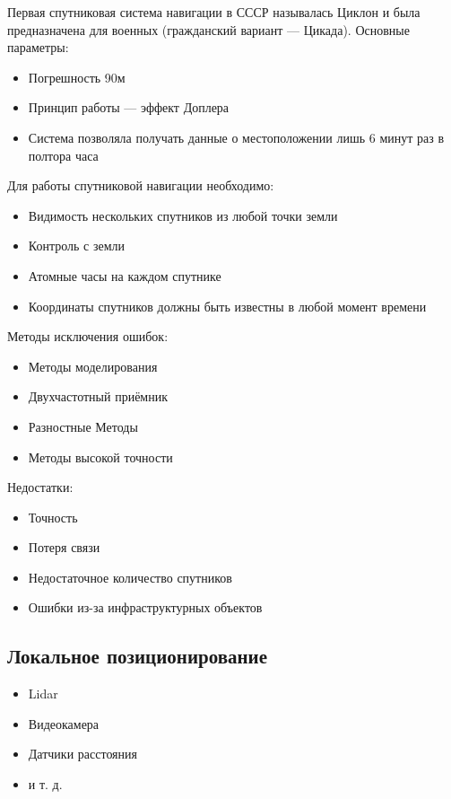 \documentclass{article}
\begin{document}
\begin{sloppypar}
    Первая спутниковая система навигации в СССР называлась Циклон и была предназначена для военных (гражданский вариант — Цикада). Основные параметры:
    \begin{itemize}
        \item Погрешность 90м
        \item Принцип работы — эффект Доплера
        \item Система позволяла получать данные о местоположении лишь 6 минут раз в полтора часа
    \end{itemize}

    Для работы спутниковой навигации необходимо:
    \begin{itemize}
        \item Видимость нескольких спутников из любой точки земли
        \item Контроль с земли
        \item Атомные часы на каждом спутнике
        \item Координаты спутников должны быть известны в любой момент времени
    \end{itemize}

    Методы исключения ошибок:
    \begin{itemize}
        \item Методы моделирования
        \item Двухчастотный приёмник
        \item Разностные Методы
        \item Методы высокой точности
    \end{itemize}

    Недостатки:
    \begin{itemize}
        \item Точность
        \item Потеря связи
        \item Недостаточное количество спутников
        \item Ошибки из-за инфраструктурных объектов
    \end{itemize}

    \subsection{Локальное позиционирование}
    \begin{itemize}
        \item Lidar
        \item Видеокамера
        \item Датчики расстояния
        \item и т. д.
    \end{itemize}


\end{sloppypar}
\end{document}
